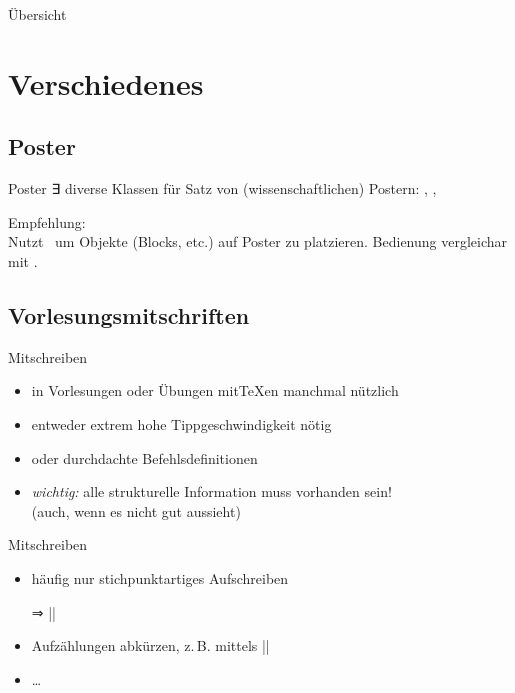 \documentclass[
	vorläufig=false,
	datum=2022-01-26,
	titel={Komplexe Makros und Befehle},
	web=true,
	max,
	aspectratio=1610,
]{../tex/latexkurs-slides}
\begin{document}
\begin{frame}{Übersicht}
	\tableofcontents
\end{frame}


\section{Verschiedenes}
\subsection{Poster}
\begin{frame}{Poster}
∃ diverse Klassen für Satz von (wissenschaftlichen) Postern: , , \\[1ex]\pause

Empfehlung: \\[1ex]

Nutzt	 \TikZ\ um Objekte (Blocks, etc.) auf Poster zu platzieren. Bedienung vergleichar mit .
\end{frame}

\subsection{Vorlesungsmitschriften}

\begin{frame}{Mitschreiben}
\begin{itemize}
	\item in Vorlesungen oder Übungen mit\TeX{}en manchmal nützlich
	\item entweder extrem hohe Tippgeschwindigkeit nötig
	\item oder durchdachte Befehlsdefinitionen
	\item \emph{wichtig:} alle strukturelle Information muss vorhanden sein!\\%
(auch, wenn es nicht gut aussieht)
\end{itemize} 
\end{frame}

\begin{frame}[fragile]{Mitschreiben}
\begin{itemize}
	\item häufig nur stichpunktartiges Aufschreiben
	\item[⇒] |\obeylines|
	\item Aufzählungen abkürzen, z.\,B. mittels |\let\+\item|
	\item …
\end{itemize}
\end{frame}
\end{document}
